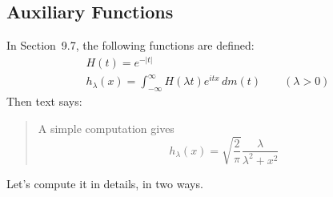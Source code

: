 \subsection{Auxiliary Functions}

In Section~9.7, the following functions are defined:
\begin{gather}
H(t) = e^{-|t|} \\
h_\lambda(x) = \int_{-\infty}^\infty H(\lambda t)e^{itx}\,dm(t) 
 \qquad (\lambda > 0)
\end{gather}
Then text says:
\begin{quote}
A simple computation gives
\begin{equation}
 \tag{Rudin(3)}
h_\lambda(x) = \sqrt{\frac{2}{\pi}} \frac{\lambda}{\lambda^2 + x^2}
\end{equation}
\end{quote}
Let's compute it in details, in two ways.
